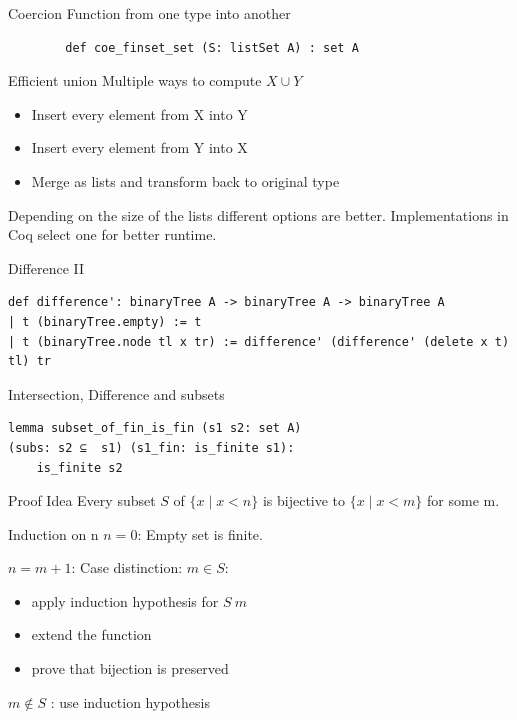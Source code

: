 \documentclass[aspectratio=169]{beamer}
\begin{document}
\begin{frame}[fragile]{Coercion}
    Function from one type into another

    \begin{lstlisting}
        def coe_finset_set (S: listSet A) : set A
    \end{lstlisting}
\end{frame}
\begin{frame}{Efficient union\cite{redblacktree}}
    Multiple ways to compute $X \cup Y$

    \begin{itemize}
        \item Insert every element from X into Y
        \item Insert every element from Y into X
        \item Merge as lists and transform back to original type
    \end{itemize}

    Depending on the size of the lists different options are better. 
    Implementations in Coq select one for better runtime.
\end{frame}

\begin{frame}[fragile]{Difference II}
    \begin{lstlisting}
def difference': binaryTree A -> binaryTree A -> binaryTree A
| t (binaryTree.empty) := t
| t (binaryTree.node tl x tr) := difference' (difference' (delete x t) tl) tr
    \end{lstlisting}
\end{frame}

\begin{frame}[fragile]{Intersection, Difference and subsets}
    \begin{lstlisting}[aboveskip=0pt, belowskip=0pt]
lemma subset_of_fin_is_fin (s1 s2: set A) 
(subs: s2 ⊆  s1) (s1_fin: is_finite s1):
    is_finite s2
    \end{lstlisting}\begin{block}{Proof Idea}
        Every subset $S$ of $\{x \mid x < n\}$ is bijective to $\{x \mid x < m\}$ for some m.
        
        Induction on n
        $n=0$: Empty set is finite.

        $n=m+1$: Case distinction: $m \in S$:
            \begin{itemize}
                \item apply induction hypothesis for $S \ {m}$
                \item extend the function
                \item prove that bijection is preserved
            \end{itemize}
            $m \not \in S$ : use induction hypothesis
    \end{block}

\end{frame}
\end{document}
